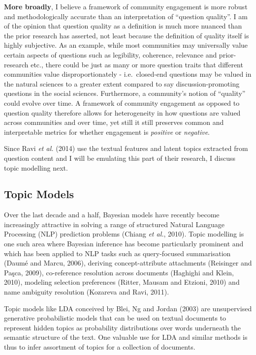 \documentclass[11pt,preprint, authoryear]{article}
\numberwithin{equation}{section}
\begin{document}
\textbf{More broadly}, I believe a framework of community engagement is
more robust and methodologically accurate than an interpretation of
``question quality''. I am of the opinion that question quality as a
definition is much more nuanced than the prior research has asserted,
not least because the definition of quality itself is highly subjective.
As an example, while most communities may universally value certain
aspects of questions such as legibility, coherence, relevance and
prior-research etc., there could be just as many or more question traits
that different communities value disproportionately - i.e.~closed-end
questions may be valued in the natural sciences to a greater extent
compared to say discussion-promoting questions in the social sciences.
Furthermore, a community's notion of ``quality'' could evolve over time.
A framework of community engagement as opposed to question quality
therefore allows for heterogeneity in how questions are valued across
communities and over time, yet still it still preserves common and
interpretable metrics for whether engagement is \emph{positive} or
\emph{negative}.

Since Ravi \emph{et al.} (2014) use the textual features and latent
topics extracted from question content and I will be emulating this part
of their research, I discuss topic modelling next.

\subsection{\texorpdfstring{Topic Models
\label{model_lit}}{Topic Models }}\label{topic-models}

Over the last decade and a half, Bayesian models have recently become
increasingly attractive in solving a range of structured Natural
Language Processing (NLP) prediction problems (Chiang \emph{et al.},
2010). Topic modelling is one such area where Bayesian inference has
become particularly prominent and which has been applied to NLP tasks
such as query-focused summarisation (Daumé and Marcu, 2006), deriving
concept-attribute attachments (Reisinger and Paşca, 2009), co-reference
resolution across documents (Haghighi and Klein, 2010), modeling
selection preferences (Ritter, Mausam and Etzioni, 2010) and name
ambiguity resolution (Kozareva and Ravi, 2011).

Topic models like LDA conceived by Blei, Ng and Jordan (2003) are
unsupervised generative probabilistic models that can be used on textual
documents to represent hidden topics as probability distributions over
words underneath the semantic structure of the text. One valuable use
for LDA and similar methods is thus to infer assortment of topics for a
collection of documents.
\end{document}
